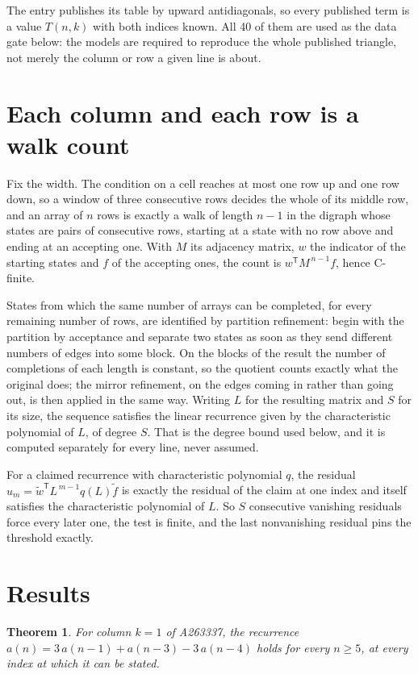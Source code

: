\documentclass[11pt]{article}
\newtheorem{theorem}{Theorem}
\theoremstyle{definition}
\begin{document}
The entry publishes its table by upward antidiagonals, so every published term is a value $T(n,k)$ with both indices known. All 40 of them are used as the data gate below: the models are required to reproduce the whole published triangle, not merely the column or row a given line is about.

\section{Each column and each row is a walk count}

Fix the width. The condition on a cell reaches at most one row up and one row down, so a window of three consecutive rows decides the whole of its middle row, and an array of $n$ rows is exactly a walk of length $n-1$ in the digraph whose states are pairs of consecutive rows, starting at a state with no row above and ending at an accepting one. With $M$ its adjacency matrix, $w$ the indicator of the starting states and $f$ of the accepting ones, the count is $w^{\mathsf T}M^{\,n-1}f$, hence C-finite.

States from which the same number of arrays can be completed, for every remaining number of rows, are identified by partition refinement: begin with the partition by acceptance and separate two states as soon as they send different numbers of edges into some block. On the blocks of the result the number of completions of each length is constant, so the quotient counts exactly what the original does; the mirror refinement, on the edges coming in rather than going out, is then applied in the same way. Writing $L$ for the resulting matrix and $S$ for its size, the sequence satisfies the linear recurrence given by the characteristic polynomial of $L$, of degree $S$. That is the degree bound used below, and it is computed separately for every line, never assumed.

For a claimed recurrence with characteristic polynomial $q$, the residual $u_m = \tilde w^{\mathsf T}L^{\,m-1}q(L)\tilde f$ is exactly the residual of the claim at one index and itself satisfies the characteristic polynomial of $L$. So $S$ consecutive vanishing residuals force every later one, the test is finite, and the last nonvanishing residual pins the threshold exactly.

\section{Results}

\begin{theorem} For column $k = 1$ of A263337, the recurrence $a(n) = 3\,a(n-1) + a(n-3) - 3\,a(n-4)$ holds for every $n \ge 5$, at every index at which it can be stated.\end{theorem}
\end{document}
